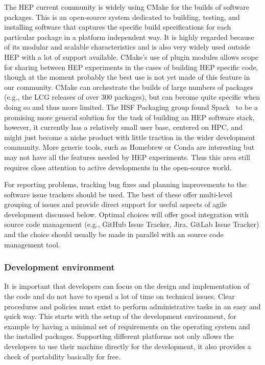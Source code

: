 \documentclass[12pt,a4paper]{article}
\begin{document}
The HEP current community is widely using CMake for the builds of
software packages. This is an open-source system dedicated to building,
testing, and installing software that captures the specific build
specifications for each particular package in a platform independent
way. It is highly regarded because of its modular and scalable
characteristics and is also very widely used outside HEP with a lot of
support available. CMake's use of plugin modules allows scope for
sharing between HEP experiments in the cases of building HEP specific
code, though at the moment probably the best use is not yet made of this
feature in our community. CMake can orchestrate the builds of large
numbers of packages (e.g., the LCG releases of over 300 packages), but
can become quite specific when doing so and thus more limited. The HSF
Packaging group found
Spack~\cite{HSF-TN-2016-03,Gamblin:2015:SPM:2807591.2807623}
to be a promising
more general solution for the task of building an HEP software stack, however, it
currently has a relatively small user base, centered on HPC, and might
just become a niche product with little traction in the wider
development community. More generic tools, such as Homebrew or
Conda are interesting but may not have all the features needed by
HEP experiments.
Thus this area still requires close attention to active developments in
the open-source world.

For reporting problems, tracking bug fixes and planning improvements to
the software issue trackers should be used. The best of these offer
multi-level grouping of issues and provide direct support for useful
aspects of agile development discussed below. Optimal choices will offer
good integration with source code management (e.g., GitHub Issue
Tracker, Jira, GitLab Issue
Tracker) and the choice should usually be made in parallel
with an source code management tool.

\hypertarget{development-environment}{%
\subsubsection{Development environment}\label{development-environment}}

It is important that developers can focus on the design and
implementation of the code and do not have to spend a lot of time on
technical issues. Clear procedures and policies must exist to perform
administrative tasks in an easy and quick way. This starts with the
setup of the development environment, for example by having a minimal
set of requirements on the operating system and the installed packages.
Supporting different platforms not only allows the developers to use
their machine directly for the development, it also provides a check of
portability basically for free.
\end{document}
